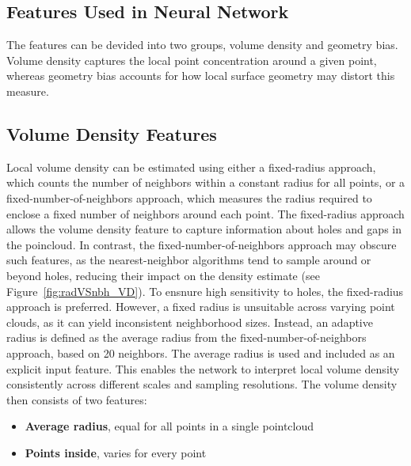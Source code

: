 \subsection{Features Used in Neural Network}
The features can be devided into two groups, volume density and geometry bias. Volume density captures the local point concentration around a given point, whereas geometry bias accounts for how local surface geometry may distort this measure.

\subsection*{Volume Density Features}
Local volume density can be estimated using either a fixed-radius approach, which counts the number of neighbors within a constant radius for all points, or a fixed-number-of-neighbors approach, which measures the radius required to enclose a fixed number of neighbors around each point. The fixed-radius approach allows the volume density feature to capture information about holes and gaps in the poincloud. In contrast, the fixed-number-of-neighbors approach may obscure such features, as the nearest-neighbor algorithms tend to sample around or beyond holes, reducing their impact on the density estimate (see Figure~\ref{fig:radVSnbh_VD}). 
To ensnure high sensitivity to holes, the fixed-radius approach is preferred. However, a fixed radius is unsuitable across varying point clouds, as it can yield inconsistent neighborhood sizes. Instead, an adaptive radius is defined as the average radius from the fixed-number-of-neighbors approach, based on 20 neighbors. The average radius is used and included as an explicit input feature. This enables the network to interpret local volume density consistently across different scales and sampling resolutions.
The volume density then consists of two features:
\begin{itemize}
    \item \textbf{Average radius}, equal for all points in a single pointcloud 
    \item \textbf{Points inside}, varies for every point
\end{itemize}

